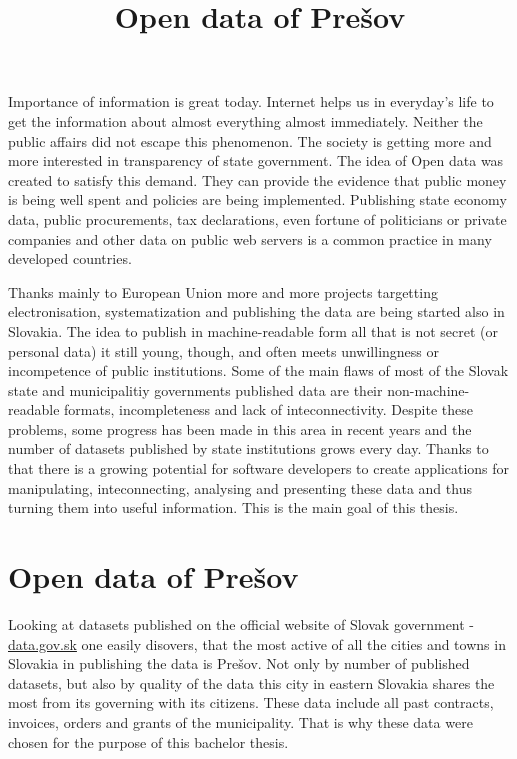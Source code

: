 \documentclass[thesis=B,english]{FITthesis}[2012/06/26]
\title{Open data of Prešov}
\begin{document}

\begin{introduction}
	Importance of information is great today. Internet helps us in everyday's life to get the information about almost everything almost immediately. 
	Neither the public affairs did not escape this phenomenon. The society is getting more and more interested in transparency of state government. The idea of Open data was created to satisfy this demand. They can provide the evidence that public money is being well spent and policies are being implemented. Publishing state economy data, public procurements, tax declarations, even fortune of politicians or private companies and other data on public web servers is a common practice in many developed countries.
	\par Thanks mainly to European Union more and more projects targetting electronisation, systematization and publishing the data are being started also in Slovakia. The idea to publish in machine-readable form all that is not secret (or personal data) it still young, though, and often meets unwillingness or incompetence of public institutions. Some of the main flaws of most of the Slovak state and municipalitiy governments published data are their non-machine-readable formats, incompleteness and lack of inteconnectivity.
	Despite these problems, some progress has been made in this area in recent years and the number of datasets published by state institutions grows every day. Thanks to that there is a growing potential for software developers to create applications for manipulating, inteconnecting, analysing and presenting these data and thus turning them into useful information. This is the main goal of this thesis.
	\section*{Open data of Prešov}
	Looking at datasets published on the official website of Slovak government - \href{https://data.gov.sk}{data.gov.sk} one easily disovers, that the most active of all the cities and towns in Slovakia in publishing the data is Prešov. Not only by number of published datasets, but also by quality of the data this city in eastern Slovakia shares the most from its governing with its citizens. These data include all past contracts, invoices, orders and grants of the municipality. That is why these data were chosen for the purpose of this bachelor thesis.

\end{introduction}
\end{document}
